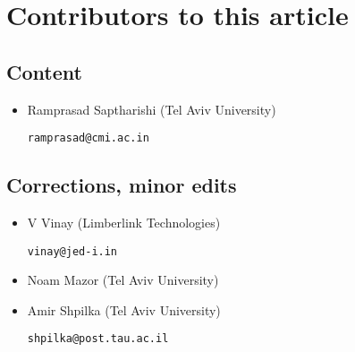 \chapter*{Contributors to this article}

\section*{Content}

\begin{itemize}
\item Ramprasad Saptharishi (Tel Aviv University)

\texttt{ramprasad@cmi.ac.in}
\end{itemize}

\section*{Corrections, minor edits}

\begin{itemize}
\item V Vinay (Limberlink Technologies)

\texttt{vinay@jed-i.in}

\item Noam Mazor (Tel Aviv University)

\item Amir Shpilka (Tel Aviv University)

\texttt{shpilka@post.tau.ac.il}

\end{itemize}


